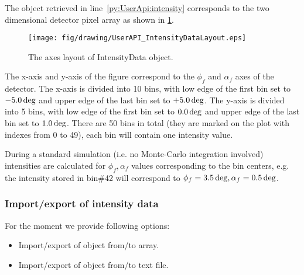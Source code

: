 The  object retrieved in line~\ref{py:UserApi:intensity} corresponds to
the two dimensional detector pixel array as shown in \cref{fig:UserApi:IntensityData}.

\begin{figure}[ht]
  \centering
    \texttt{[image: fig/drawing/UserAPI\_IntensityDataLayout.eps]}
  \caption{The axes layout of IntensityData object.}
  \label{fig:UserApi:IntensityData}
\end{figure}

The x-axis and y-axis of the figure correspond to the $\phi_f$ and $\alpha_f$ axes of the detector.
The x-axis is divided into 10 bins,
with low edge of the first bin set to $-5.0\,{\rm deg}$ and upper edge of the last bin set to $+5.0\,{\rm deg}$.
The y-axis is divided into 5 bins,
with low edge of the first bin set to $0.0\,{\rm deg}$ and upper edge of the last bin set to $1.0\,{\rm deg}$.
There are 50 bins in total (they are marked on the plot with indexes from 0 to 49), each bin will contain one intensity value.

During a standard simulation (i.e. no Monte-Carlo integration involved) intensities are calculated for $\phi_f, \alpha_f$ values corresponding to the bin centers, e.g. the intensity stored in bin\#42 will correspond to $\phi_f=3.5\,{\rm deg}, \alpha_f=0.5\,{\rm deg}$.
\vspace*{2mm}




\subsubsection{Import/export of intensity data}
For the moment we provide following options:
\begin{itemize}
\item Import/export of  object from/to  array.
\item Import/export of  object from/to text file.

\end{itemize}

